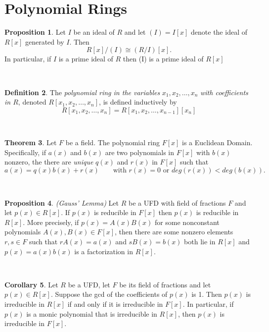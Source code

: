 \documentclass{article}
\theoremstyle{definition}
\newtheorem{thm}{Theorem}[section]
\newtheorem{prop}[thm]{Proposition}
\newtheorem{cor}[thm]{Corollary}
\newtheorem{defn}[thm]{Definition}
\newcommand{\nl}{\vspace{4cm}\\}
\begin{document}
\setcounter{section}{8}
\section{Polynomial Rings}
\setcounter{thm}{0}

\begin{prop}
Let $I$ be an ideal of $R$ and let $(I) = I[x]$ denote the ideal of $R[x]$ generated by $I$. Then 
\[R[x]/(I) \cong (R/I)[x].\]
In particular, if $I$ is a prime ideal of $R$ then (I) is a prime ideal of $R[x]$
\end{prop}

\nl

\begin{defn}
The \textit{polynomial ring in the variables} $x_1,x_2,\ldots,x_n$ \textit{with coefficients in $R$}, denoted $R[x_1,x_2,\ldots,x_n]$, is defined inductively by
\[R[x_1,x_2,\ldots,x_n] = R[x_1,x_2,\ldots,x_{n-1}][x_n]\]
\end{defn}

\nl

\begin{thm}
Let $F$ be a field. The polynomial ring $F[x]$ is a Euclidean Domain. Specifically, if $a(x)$ and $b(x)$ are two polynomials in $F[x]$ with $b(x)$ nonzero, the there are \textit{unique} $q(x)$ and $r(x)$ in $F[x]$ such that
\[a(x) = q(x)b(x) + r(x)\qquad\text{with } r(x) = 0\text{ or } deg(r(x))<deg(b(x)).\]
\end{thm}

\nl

\begin{prop}\textit{(Gauss' Lemma)} Let $R$ be a UFD with field of fractions $F$ and let $p(x)\in R[x]$. If $p(x)$ is reducible in $F[x]$ then $p(x)$ is reducible in $R[x]$. More precisely, if $p(x) = A(x)B(x)$ for some nonconstant polynomials $A(x),B(x)\in F[x]$, then there are some nonzero elements $r,s\in F$ such that $rA(x) = a(x)$ and $sB(x) = b(x)$ both lie in $R[x]$ and $p(x) = a(x)b(x)$ is a factorization in $R[x]$.
\end{prop}

\nl

\begin{cor}
Let $R$ be a UFD, let $F$ be its field of fractions and let $p(x)\in R[x]$. Suppose the gcd of the coefficients of $p(x)$ is 1. Then $p(x)$ is irreducible in $R[x]$ if and only if it is irreducible in $F[x]$. In particular, if $p(x)$ is a monic polynomial that is irreducible in $R[x]$, then $p(x)$ is irreducible in $F[x]$.
\end{cor}
\end{document}
